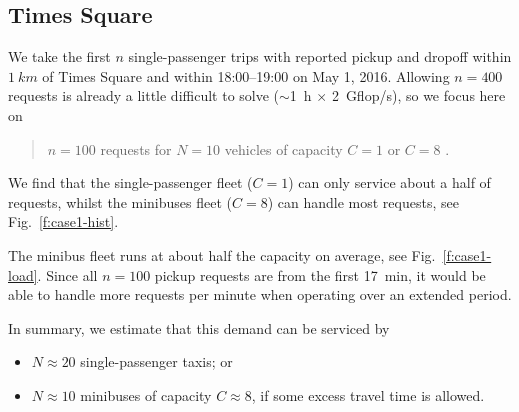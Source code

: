 \documentclass[12pt,notitlepage]{article}
\begin{document}
\subsection{Times Square} \label{s:case1}

We take%
the first $n$ single-passenger trips 
with
reported pickup and dropoff 
within
$\SI{1}{km}$ of Times Square
and
within 
18:00--19:00 on May 1, 2016.
%
%
Allowing $n = 400$ requests
is already a little difficult to solve ($\sim$\SI{1}{h} $\times$ \SI{2}{Gflop/s}),
so we focus here on
\begin{quote}
	$n = 100$ requests
	for
	$N = 10$ vehicles of capacity $C = 1$ or $C = 8$
	.
\end{quote}

%

We find that the single-passenger fleet ($C = 1$)
can only service about a half of requests,
whilst
the minibuses fleet ($C = 8$) can handle most requests,
see Fig.~\ref{f:case1-hist}.

%

The minibus fleet runs at about half the capacity on average, see Fig.~\ref{f:case1-load}.
%
Since all $n = 100$ pickup requests are from the first \SI{17}{min},
it would be able to handle more requests per minute
when operating over an extended period.

%

In summary,
we estimate that this demand can be serviced by 
\begin{itemize}
\item 
	$N \approx 20$ single-passenger taxis; or
\item
	$N \approx 10$ minibuses of capacity $C \approx 8$,
	if some excess travel time is allowed.
\end{itemize}

%



\end{document}
